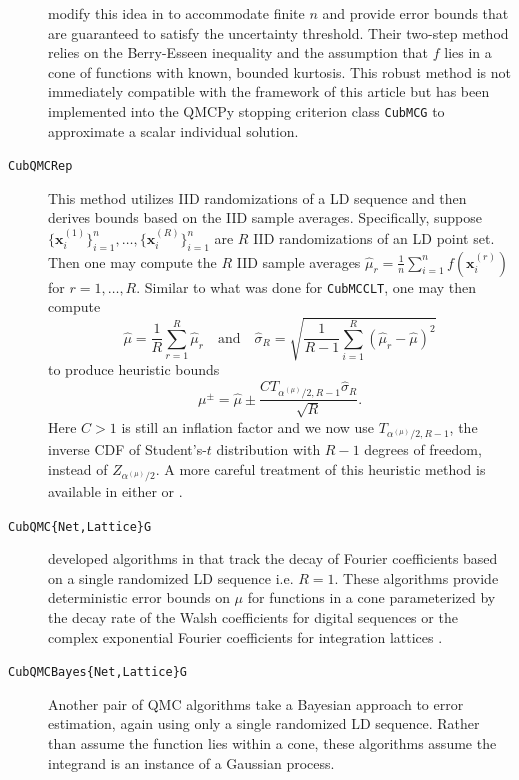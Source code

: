 \documentclass[graybox]{svmult}
\begin{document}
\begin{description}
    \citeauthor{cubmcg} modify this idea in \cite{cubmcg} to accommodate  finite $n$ and provide error bounds that are guaranteed to satisfy the uncertainty threshold. Their two-step method relies on the Berry-Esseen inequality and the assumption that $f$ lies in a cone of functions with known, bounded kurtosis. This robust method is not immediately compatible with the framework of this article but has been implemented into the QMCPy stopping criterion class \texttt{CubMCG} to approximate a scalar individual solution.
    \item[\texttt{CubQMCRep}] This method utilizes IID randomizations of a LD sequence and then derives bounds based on the IID sample averages. Specifically, suppose $\{\boldsymbol{x}_i^{(1)}\}_{i=1}^n,\dots,\{\boldsymbol{x}_i^{(R)}\}_{i=1}^n$ are $R$ IID randomizations of an LD point set. Then one may compute the $R$ IID sample averages $\hat{\mu}_r = \frac{1}{n} \sum_{i=1}^n f(\boldsymbol{x}_i^{(r)})$ for $r = 1,\dots,R$. Similar to what was done for \texttt{CubMCCLT}, one may then compute 
    $$\hat{\mu} = \frac{1}{R} \sum_{r=1}^R \hat{\mu}_r \quad\text{and}\quad \hat{\sigma}_R = \sqrt{\frac{1}{R-1}\sum_{i=1}^R(\hat{\mu}_r - \hat{\mu})^2}$$
    to produce heuristic bounds  
    $$\mu^\pm = \hat{\mu} \pm \frac{C T_{\alpha^{(\mu)}/2,R-1} \hat{\sigma}_R}{\sqrt{R}}.$$
    Here $C>1$ is still an inflation factor and we now use $T_{\alpha^{(\mu)}/2,R-1}$, the inverse CDF of Student's-$t$ distribution with $R-1$ degrees of freedom, instead of $Z_{\alpha^{(\mu)}/2}$.
    A more careful treatment of this heuristic method is available in either \cite[Chapter 17]{mcbook} or \cite{qmc4pde_preprint}. 
    \item[\texttt{CubQMC\{Net,Lattice\}G}] \citeauthor{cubqmclattice} developed algorithms in \cite{adaptive_qmc} that track the decay of Fourier coefficients based on a single randomized LD sequence i.e. $R=1$. These algorithms provide deterministic error bounds on $\mu$ for functions in a cone parameterized by the decay rate of the Walsh coefficients for digital sequences \cite{cubqmcsobol} or the complex exponential Fourier coefficients for integration lattices \cite{cubqmclattice}. %
    \item[\texttt{CubQMCBayes\{Net,Lattice\}G}] Another pair of QMC algorithms take a Bayesian approach to error estimation, again using only a single randomized LD sequence. Rather than assume the function lies within a cone, these algorithms assume the integrand is an instance of a Gaussian process. 

\end{description}
\end{document}
